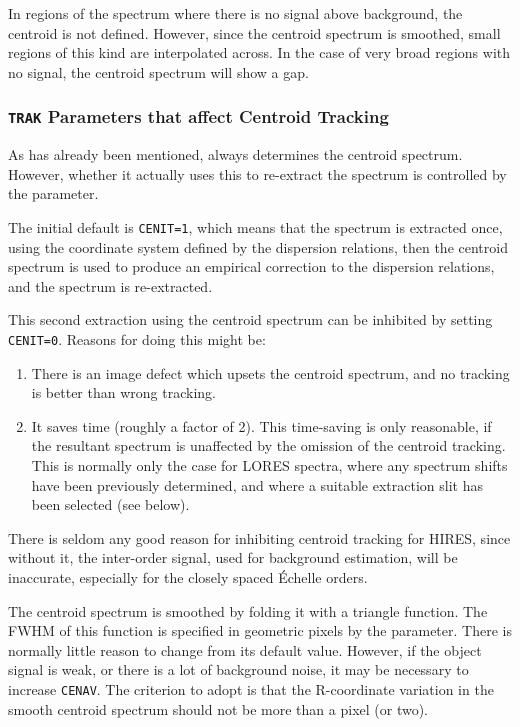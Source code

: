 In regions of the spectrum where there is no signal above background, the
centroid is not defined.  However, since the centroid spectrum is smoothed,
small regions of this kind are interpolated across.  In the case of very
broad regions with no signal, the centroid spectrum will show a gap.

\subsubsection{{\tt TRAK} Parameters that affect Centroid Tracking}

As has already been mentioned, 
 always determines the centroid
spectrum.  However, whether it actually uses this to re-extract the spectrum
is controlled by the 
 parameter.

The initial default is \verb+CENIT=1+, which means that the spectrum is
extracted once, using the coordinate system defined by the dispersion
relations, then the centroid spectrum is used to produce an empirical
correction to the dispersion relations, and the spectrum is re-extracted.

This second extraction using the centroid spectrum can be inhibited by
setting \verb+CENIT=0+\@. Reasons for doing this might be:

\begin{enumerate}

\item There is an image defect which upsets the centroid spectrum, and no
      tracking is better than wrong tracking.

\item It saves time (roughly a factor of 2)\@.  This time-saving is only
      reasonable, if the resultant spectrum is unaffected by the omission of
      the centroid tracking.  This is normally only the case for LORES spectra,
      where any spectrum shifts have been previously determined, and where a
      suitable extraction slit has been selected (see below)\@.

\end{enumerate}

There is seldom any good reason for inhibiting centroid tracking for HIRES,
since without it, the inter-order signal, used for background estimation, will
be inaccurate, especially for the closely spaced \'{E}chelle orders.

The centroid spectrum is smoothed by folding it with a triangle function.
The FWHM of this function is specified in geometric pixels by the
 parameter.
There is normally little reason to change 
from its default value.
However, if the object signal is weak, or there is a lot of
background noise, it may be necessary to increase \verb+CENAV+\@.  The
criterion to adopt is that the R-coordinate variation in the smooth centroid
spectrum should not be more than a pixel (or two)\@.

